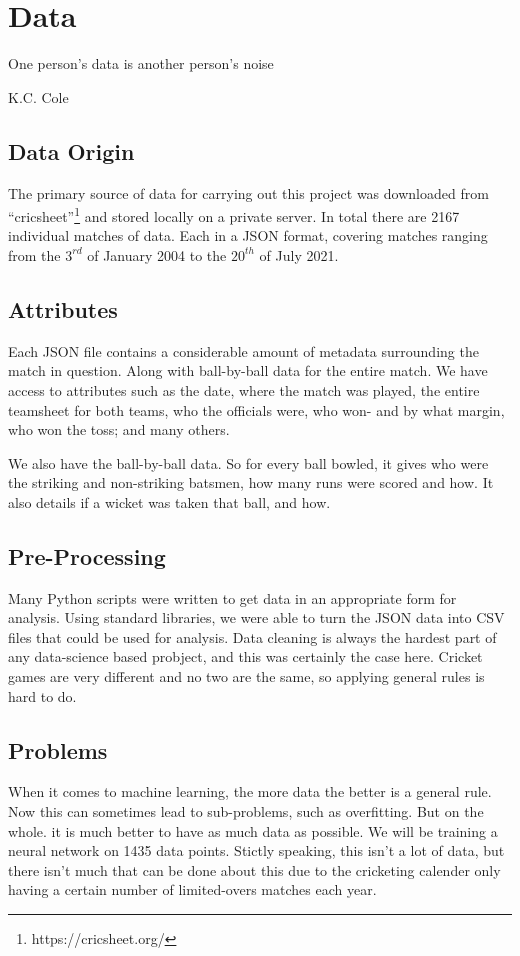 \chapter{Data}

\epigraph{One person's data is another person's noise}{K.C. Cole}

\section{Data Origin}
The primary source of data for carrying out this project was downloaded from ``cricsheet''\footnote{https://cricsheet.org/}
and stored locally on a private server. In total there are 2167 individual matches of data. Each in a JSON format, 
covering matches ranging from the $3^{rd}$ of January 2004 to the $20^{th}$ of July 2021.

\section{Attributes}
Each JSON file contains a considerable amount of metadata surrounding the match in question. Along with 
ball-by-ball data for the entire match. We have access to attributes such as the date, where the match was played,
the entire teamsheet for both teams, who the officials were, who won- and by what margin, who won the toss; and many others.

We also have the ball-by-ball data. So for every ball bowled, it gives who were the striking and non-striking batsmen, how many runs
were scored and how. It also details if a wicket was taken that ball, and how.

\section{Pre-Processing}
Many Python scripts were written to get data in an appropriate form for analysis. Using standard libraries, we were able to turn the JSON data 
into CSV files that could be used for analysis. Data cleaning is always the hardest part of any data-science based probject, and this was certainly the case 
here. Cricket games are very different and no two are the same, so applying general rules is hard to do.

\section{Problems}
When it comes to machine learning, the more data the better is a general rule. Now this can sometimes lead to sub-problems, such as overfitting. But on the whole.
it is much better to have as much data as possible. We will be training a neural network on 1435 data points. Stictly speaking, this isn't a lot of data, but there
isn't much that can be done about this due to the cricketing calender only having a certain number of limited-overs matches each year.
